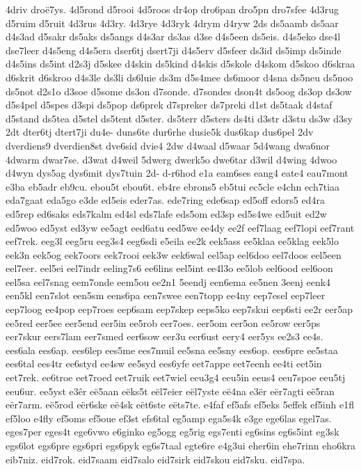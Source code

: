 4driv
droë7ys.
4d5rond
d5rooi
4d5roos
dr4op
dro6pan
dro5pn
dro7sfee
4d3rug
d5ruim
d5ruit
4d3rus
4d3ry.
4d3rye
4d3ryk
4drym
d4ryw
2ds
ds5aamb
ds5aar
d4s3ad
d5sakr
ds5aks
ds5angs
d4s3ar
ds3as
d3se
d4s5een
ds5eis.
d4s5eko
dse4l
dse7leer
d4s5eng
d4s5era
dser6tj
dsert7ji
d4s5erv
d5sfeer
ds3id
ds5imp
ds5inde
d4s5ins
ds5int
d2s3j
d5skee
d4skin
ds5kind
d4skis
d5skole
d4skom
d5skoo
d6skraa
d6skrit
d6skroo
d4s3le
ds3li
ds6luie
ds3m
d5s4mee
ds6moor
d4sna
ds5neu
ds5noo
ds5not
d2s1o
d3soe
d5some
ds3on
d7sonde.
d7sondes
dson4t
ds5oog
ds3op
ds3ow
d5s4pel
d5spes
d3spi
ds5pop
ds6prek
d7spreker
ds7preki
d1st
ds5taak
d4staf
d5stand
ds5tea
d5stel
ds5tent
d5ster.
ds5terr
d5sters
ds4ti
d3str
d3stu
ds3w
d3sy
2dt
dter6tj
dtert7ji
du4e-
duns6te
dur6rhe
dusie5k
dus6kap
dus6pel
2dv
dverdiens9
dverdien8st
dve6sid
dvie4
2dw
d4waal
d5waar
5d4wang
dwa6nor
4dwarm
dwar7se.
d3wat
d4weil
5dwerg
dwerk5o
dwe6tar
d3wil
d4wing
4dwoo
d4wyn
dys5ag
dys6mit
dys7tuin
2d-
d-r6hod
e1a
eam6ses
eang4
eate4
eau7mont
e3ba
eb5adr
eb9cu.
ebou5t
ebou6t.
eb4re
ebrons5
eb5tui
ec5cle
e4chn
ech7tiaa
eda7gaat
eda5go
e3de
ed5eis
eder7as.
ede7ring
ede6sap
ed5off
edors5
ed4ra
ed5rep
ed6saks
eds7kalm
ed4sl
eds7lafe
eds5om
ed3sp
ed5s4we
ed5uit
ed2w
ed5woo
ed5yst
ed3yw
ee5agt
eed6atu
eed5we
ee4dy
ee2f
eef7laag
eef7lopi
eef7rant
eef7rek.
eeg3l
eeg5ru
eeg3s4
eeg6sdi
e5eila
ee2k
eek5ass
ee5klaa
ee5klag
eek5lo
eek3n
eek5og
eek7oors
eek7rooi
eek3w
eek6wal
eel5ap
eel6doo
eel7doos
eel5een
eel7eer.
eel5ei
eel7indr
eeling7s6
ee6lins
eel5int
ee4l3o
ee5lob
eel6ood
eel6oon
eel5sa
eel7snag
eem7onde
eem5ou
ee2n1
5eendj
een6ema
ee5nen
3eenj
eenk4
een5kl
een7slot
een5sm
eens6pa
een7swee
een7topp
ee4ny
eep7esel
eep7leer
eep7loog
ee4pop
eep7roes
eep6sam
eep7skep
eeps5ko
eep7skui
eep6sti
ee2r
eer5ap
ee5red
eer5ee
eer5end
eer5in
ee5rob
eer7oes.
eer5om
eer5on
ee5row
eer5ps
eer7skur
eers7lam
eer7smed
eer6sow
eer3u
eer6ust
eery4
eer5ys
ee2s3
ee4s.
ees6ala
ees6ap.
ees6lep
ees5me
ees7muil
ee5sna
ee5sny
ees6op.
ees6pre
ee5staa
ees6tal
ees4tr
ee6styd
ee4sw
ee5syd
ees6yfe
eet7appe
eet7eenh
ee4ti
eet5in
eet7rek.
ee6troe
eet7roed
eet7ruik
eet7wiel
eeu3g4
eeu5in
eeus4
eeu7spoe
eeu5tj
eeu6ur.
ee5yst
e3êr
eë5aan
eëks5t
eël7eier
eël7yste
eë4na
e3ër
eër7agti
eë5ran
eër7arm.
eë5rod
eër6ske
eë4sk
eët6ste
eëts7te.
e4faf
ef5afs
ef5eks
5effek
ef5inh
e1fl
ef5loo
e4fly
ef5oms
ef5oue
ef3st
efs6tal
eg5amp
ega5s4k
e3ge
ege6las
egel7as.
eges7per
eges4t
ege6vwo
e6ginko
eg5ogg
eg5rig
egs7enti
eg6sins
eg6s5int
eg3sk
egs6lot
egs6pre
egs6pri
egs6pyk
eg6s7taal
egte6re
e4g3ui
eher6in
ehe7rinn
eho6kra
eib7niz.
eid7rok.
eid7saam
eid7salo
eid7sirk
eid7skou
eid7sku.
eid7spa.
